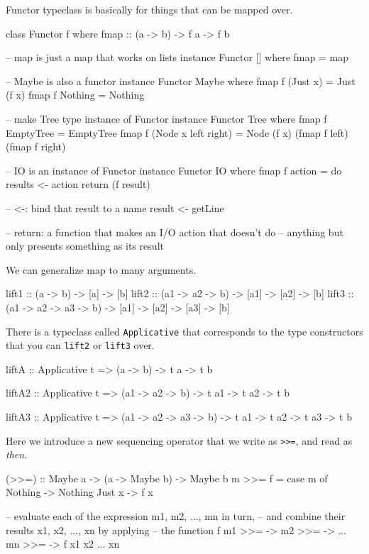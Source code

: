 Functor typeclass is basically for things that can be mapped over. 
\begin{haskellcode}
class Functor f where  
    fmap :: (a -> b) -> f a -> f b

-- map is just a map that works on lists
instance Functor [] where
    fmap = map

-- Maybe is also a functor
instance Functor Maybe where
    fmap f (Just x) = Just (f x)
    fmap f Nothing = Nothing

-- make Tree type instance of Functor
instance Functor Tree where
    fmap f EmptyTree = EmptyTree
    fmap f (Node x left right) = Node (f x) 
           (fmap f left) (fmap f right)

-- IO is an instance of Functor
instance Functor IO where
    fmap f action = do
        results <- action
        return (f result)

-- <-: bind that result to a name
result <- getLine

-- return: a function that makes an I/O action that doesn't do 
--         anything but only presents something as its result

\end{haskellcode}


We can generalize map to many arguments.
\begin{haskellcode}
lift1 :: (a -> b) -> [a] -> [b]
lift2 :: (a1 -> a2 -> b) -> [a1] -> [a2] -> [b]
lift3 :: (a1 -> a2 -> a3 -> b) -> [a1] -> [a2] -> [a3] -> [b]
\end{haskellcode}

There is a typeclass called \texttt{Applicative} that corresponds to 
the type constructors that you can \texttt{lift2} or \texttt{lift3} over.

\begin{haskellcode}
liftA  :: Applicative t => (a -> b) -> t a -> t b

liftA2 :: Applicative t 
       => (a1 -> a2 -> b) 
       -> t a1 
       -> t a2 
       -> t b

liftA3 :: Applicative t 
       => (a1 -> a2 -> a3 -> b) 
       -> t a1 
       -> t a2
       -> t a3
       -> t b
\end{haskellcode}   


Here we introduce a new sequencing operator that we write as 
\texttt{>>=}, and read as \textit{then}.

\begin{haskellcode}
(>>=)   :: Maybe a -> (a -> Maybe b) -> Maybe b
m >>= f =  case m of
             Nothing -> Nothing
             Just x  -> f x

-- evaluate each of the expression m1, m2, ..., mn in turn,
-- and combine their results x1, x2, ..., xn by applying 
-- the function f
m1 >>=  ->
  m2 >>=  ->
  ...
    mn >>= \xn ->
      f x1 x2 ... xn
\end{haskellcode}

